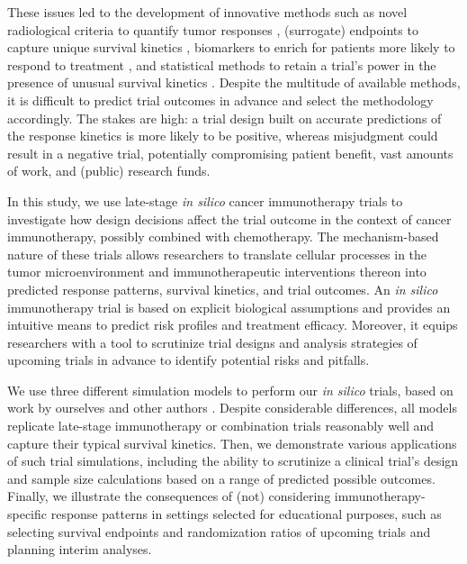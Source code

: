\documentclass[a4paper,10pt]{article}
\begin{document}
These issues led to the development of innovative methods such as novel radiological criteria
to quantify tumor responses \cite{Seymour2017, Hodi2018, Wolchok2009}, 
(surrogate) endpoints to capture unique survival kinetics 
\cite{Hoos2010, Anagnostou2017, Mushti2018, Chen2015, Kaufman2017},
biomarkers to enrich for patients more likely to respond to treatment 
\cite{Chan2019, Dudley2016, Patel2015, Sha2020}, 
and statistical methods to retain a trial's power in the presence of unusual survival 
kinetics \cite{Chen2018, Royston2013, Xu2016}. Despite
the multitude of available methods, it is difficult to predict trial outcomes 
in advance and select the methodology accordingly. The stakes are high: a trial design 
built on accurate predictions of the response kinetics is more likely to be positive,
whereas misjudgment could result in a negative trial, potentially compromising patient benefit,
vast amounts of work, and  (public) research funds.

In this study, we use late-stage \emph{in silico} cancer immunotherapy trials to investigate how design
decisions affect the trial outcome in the context of cancer immunotherapy, possibly combined with
chemotherapy. The mechanism-based nature of these trials allows researchers to translate cellular
processes in the tumor microenvironment and immunotherapeutic interventions thereon into predicted
response patterns, survival kinetics, and trial outcomes. An \emph{in silico}
immunotherapy trial is based on explicit biological assumptions and provides an intuitive means to
predict risk profiles and treatment efficacy. Moreover, it equips researchers with a tool to scrutinize trial
designs and analysis strategies of upcoming trials in advance to identify potential risks and pitfalls.

We use three different simulation models to perform our \emph{in silico} trials, based on
work by ourselves \cite{Creemers2021} and other authors \cite{Tsur2020,Bekker2022}.
Despite considerable differences, all models replicate late-stage immunotherapy or combination trials
reasonably well and capture their typical survival kinetics. Then, we demonstrate various applications of
such trial simulations, including the ability to scrutinize a clinical trial's design and sample size
calculations based on a range of predicted possible outcomes. Finally, we illustrate the consequences 
of (not) considering  immunotherapy-specific response patterns in settings selected for educational purposes,
such as  selecting survival endpoints and randomization ratios of upcoming trials and planning
interim analyses. 
\end{document}
